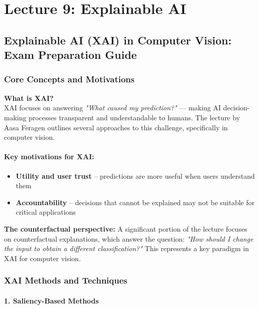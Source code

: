\chapter{\normalsize Lecture 9: Explainable AI}

\section*{Explainable AI (XAI) in Computer Vision: Exam Preparation Guide}

\subsection*{Core Concepts and Motivations}

\textbf{What is XAI?} \\
XAI focuses on answering \textit{"What caused my prediction?"} — making AI decision-making processes transparent and understandable to humans. The lecture by Aasa Feragen outlines several approaches to this challenge, specifically in computer vision.

\subsubsection*{Key motivations for XAI:}
\begin{itemize}
    \item \textbf{Utility and user trust} – predictions are more useful when users understand them
    \item \textbf{Accountability} – decisions that cannot be explained may not be suitable for critical applications
\end{itemize}

\textbf{The counterfactual perspective:} A significant portion of the lecture focuses on counterfactual explanations, which answer the question: \textit{"How should I change the input to obtain a different classification?"} This represents a key paradigm in XAI for computer vision.

\subsection*{XAI Methods and Techniques}

\subsubsection*{1. Saliency-Based Methods}


